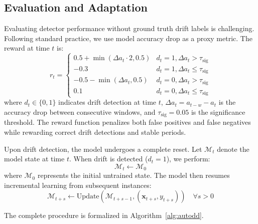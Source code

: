 \documentclass{article}
\begin{document}
\subsection{Evaluation and Adaptation}

Evaluating detector performance without ground truth drift labels is challenging. Following standard practice, we use model accuracy drop as a proxy metric. The reward at time $t$ is:
\begin{equation}
\label{eq:reward}
r_t = \begin{cases}
0.5 + \min(\Delta a_t \cdot 2, 0.5) & d_t=1, \Delta a_t > \tau_{\text{sig}} \\
-0.3 & d_t=1, \Delta a_t \leq \tau_{\text{sig}} \\
-0.5 - \min(\Delta a_t, 0.5) & d_t=0, \Delta a_t > \tau_{\text{sig}} \\
0.1 & d_t=0, \Delta a_t \leq \tau_{\text{sig}}
\end{cases}
\end{equation}
where $d_t \in \{0,1\}$ indicates drift detection at time $t$, $\Delta a_t = a_{t-w} - a_t$ is the accuracy drop between consecutive windows, and $\tau_{\text{sig}} = 0.05$ is the significance threshold. The reward function penalizes both false positives and false negatives while rewarding correct drift detections and stable periods.

Upon drift detection, the model undergoes a complete reset. Let $\mathcal{M}_t$ denote the model state at time $t$. When drift is detected ($d_t = 1$), we perform:
\begin{equation}
\mathcal{M}_t \gets \mathcal{M}_0
\end{equation}
where $\mathcal{M}_0$ represents the initial untrained state. The model then resumes incremental learning from subsequent instances:
\begin{equation}
\mathcal{M}_{t+s} \gets \text{Update}(\mathcal{M}_{t+s-1}, (\mathbf{x}_{t+s}, y_{t+s})) \quad \forall s > 0
\end{equation}

The complete procedure is formalized in Algorithm~\ref{alg:autodd}.
\end{document}

